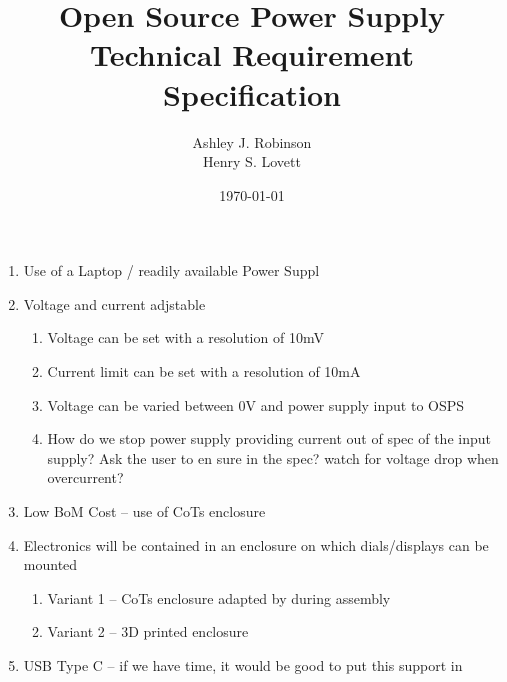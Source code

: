 \documentclass[12pt,a4paper]{article}
\title{Open Source Power Supply\\ Technical Requirement Specification}
\author{Ashley J. Robinson \\ Henry S. Lovett}
\date{\today}
\begin{document}
\maketitle

\begin{enumerate}

\item Use of a Laptop / readily available Power Suppl
\item Voltage and current adjstable
	\begin{enumerate}
	\item Voltage can be set with a resolution of 10mV
	\item Current limit can be set with a resolution of 10mA
	\item Voltage can be varied between 0V and power supply input to OSPS
	\item How do we stop power supply providing current out of spec of the input supply? Ask the user to en sure in the spec? watch for voltage drop when overcurrent?
	\end{enumerate}
\item Low BoM Cost – use of CoTs enclosure
\item Electronics will be contained in an enclosure on which dials/displays can be mounted
	\begin{enumerate}
	\item Variant 1 – CoTs enclosure adapted by during assembly
	\item Variant 2 – 3D printed enclosure
	\end{enumerate}
\item  USB Type C – if we have time, it would be good to put this support in
\end{enumerate}
\end{document}
